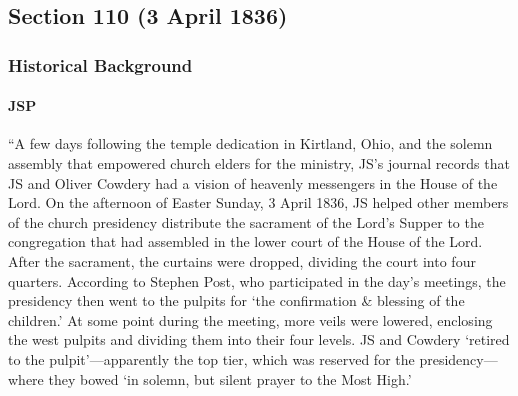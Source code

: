 \subsection{Section 110 (3 April 1836)}
	\label{DC110}
	
	\subsubsection{Historical Background}
		\label{DC110-HB}
		
		\paragraph{JSP}
		
			``A few days following the temple dedication in Kirtland, Ohio, and the solemn assembly that empowered church elders for the ministry, JS's journal records that JS and Oliver Cowdery had a vision of heavenly messengers in the House of the Lord. On the afternoon of Easter Sunday, 3 April 1836, JS helped other members of the church presidency distribute the sacrament of the Lord's Supper to the congregation that had assembled in the lower court of the House of the Lord. After the sacrament, the curtains were dropped, dividing the court into four quarters. According to Stephen Post, who participated in the day's meetings, the presidency then went to the pulpits for `the confirmation \& blessing of the children.' At some point during the meeting, more veils were lowered, enclosing the west pulpits and dividing them into their four levels. JS and Cowdery `retired to the pulpit'---apparently the top tier, which was reserved for the presidency---where they bowed `in solemn, but silent prayer to the Most High.'
			
